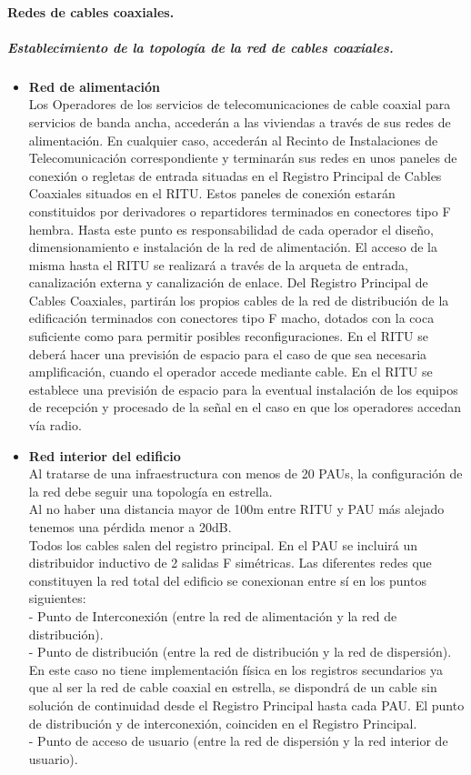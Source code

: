 \paragraph{Redes de cables coaxiales.}
\subparagraph{Establecimiento de la topología de la red de cables coaxiales.}
\begin{itemize}
	\item \textbf{Red de alimentación}\\
	Los Operadores de los servicios de telecomunicaciones de cable coaxial para servicios de banda
ancha, accederán a las viviendas a través de sus redes de alimentación. En cualquier caso, accederán
al Recinto de Instalaciones de Telecomunicación correspondiente y terminarán sus redes en unos
paneles de conexión o regletas de entrada situadas en el Registro Principal de Cables Coaxiales
situados en el RITU. Estos paneles de conexión estarán constituidos por derivadores o
repartidores terminados en conectores tipo F hembra.
Hasta este punto es responsabilidad de cada operador el diseño, dimensionamiento e instalación
de la red de alimentación. El acceso de la misma hasta el RITU se realizará a través de la arqueta
de entrada, canalización externa y canalización de enlace.
Del Registro Principal de Cables Coaxiales, partirán los propios cables de la red de distribución
de la edificación terminados con conectores tipo F macho, dotados con la coca suficiente como
para permitir posibles reconfiguraciones.
En el RITU se deberá hacer una previsión de espacio para el caso de que sea necesaria
amplificación, cuando el operador accede mediante cable.
En el RITU se establece una previsión de espacio para la eventual instalación de los equipos de
recepción y procesado de la señal en el caso en que los operadores accedan vía radio.
\end{itemize}
\begin{itemize}
	\item \textbf{Red interior del edificio}\\
Al tratarse de una infraestructura con menos de 20 PAUs, la configuración de la red debe seguir una topología en estrella.\\
Al no haber una distancia mayor de 100m entre RITU y PAU más alejado tenemos una pérdida menor a 20dB.\\
Todos los cables salen del registro principal.
En el PAU se incluirá un distribuidor inductivo de 2 salidas F simétricas.
Las diferentes redes que constituyen la red total del edificio se conexionan entre sí en los puntos
siguientes:\\
- Punto de Interconexión (entre la red de alimentación y la red de distribución).\\
- Punto de distribución (entre la red de distribución y la red de dispersión). En este caso no tiene
implementación física en los registros secundarios ya que al ser la red de cable coaxial en
estrella, se dispondrá de un cable sin solución de continuidad desde el Registro Principal hasta
cada PAU. El punto de distribución y de interconexión, coinciden en el Registro Principal.\\
- Punto de acceso de usuario (entre la red de dispersión y la red interior de usuario).\\
\end{itemize}
